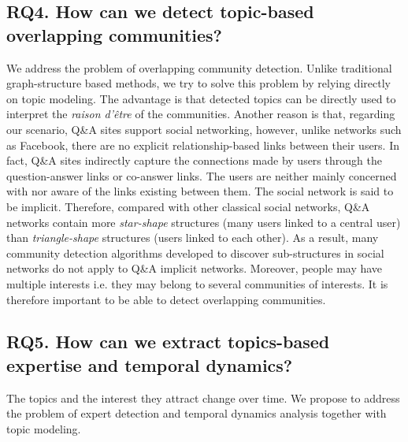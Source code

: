 \subsection*{RQ4. How can we detect topic-based overlapping communities?}
We address the problem of overlapping community detection. Unlike traditional graph-structure based methods, we try to solve this problem by relying directly on topic modeling. The advantage is that detected topics can be directly used to interpret the \textit{raison d'\^etre} of the communities. Another reason is that, regarding our scenario, Q\&A sites support social networking, however, unlike networks such as Facebook, there are no explicit relationship-based links between their users. In fact, Q\&A sites indirectly capture the connections made by users through the question-answer links or co-answer links. The users are neither mainly concerned with nor aware of the links existing between them. The social network is said to be implicit. Therefore, compared with other classical social networks, Q\&A networks contain more \textit{star-shape} structures (many users linked to a central user) than \textit{triangle-shape} structures (users linked to each other). As a result, many community detection algorithms developed to discover sub-structures in social networks do not apply to Q\&A implicit networks. 
Moreover, people may have multiple interests i.e. they may belong to several communities of interests. It is therefore important to be able to detect overlapping communities. 

\subsection*{RQ5. How can we extract topics-based expertise and temporal dynamics?}
The topics and the interest they attract change over time. We propose to address the problem of expert detection and temporal dynamics analysis together with topic modeling. 



